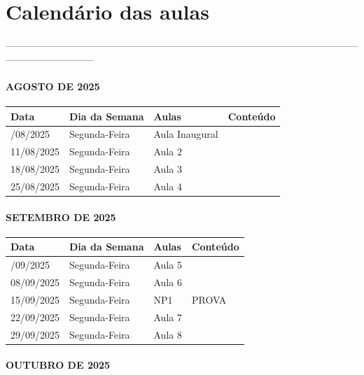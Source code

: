\documentclass[
]{book}
\begin{document}
\section{Calendário das aulas}\label{calenduxe1rio-das-aulas}

---------------------------------------------------------------------------------------------------------------------------------------

\paragraph{AGOSTO DE 2025}\label{agosto-de-2025}

\begin{longtable}[]{@{}llll@{}}
\toprule\noalign{}
Data & Dia da Semana & Aulas & Conteúdo \\
\midrule\noalign{}
\endhead
\bottomrule\noalign{}
\endlastfoot
04/08/2025 & Segunda-Feira & Aula Inaugural & \\
11/08/2025 & Segunda-Feira & Aula 2 & \\
18/08/2025 & Segunda-Feira & Aula 3 & \\
25/08/2025 & Segunda-Feira & Aula 4 & \\
\end{longtable}

\paragraph{SETEMBRO DE 2025}\label{setembro-de-2025}

\begin{longtable}[]{@{}llll@{}}
\toprule\noalign{}
Data & Dia da Semana & Aulas & Conteúdo \\
\midrule\noalign{}
\endhead
\bottomrule\noalign{}
\endlastfoot
01/09/2025 & Segunda-Feira & Aula 5 & \\
08/09/2025 & Segunda-Feira & Aula 6 & \\
15/09/2025 & Segunda-Feira & NP1 & PROVA \\
22/09/2025 & Segunda-Feira & Aula 7 & \\
29/09/2025 & Segunda-Feira & Aula 8 & \\
\end{longtable}

\paragraph{OUTUBRO DE 2025}\label{outubro-de-2025}
\end{document}
